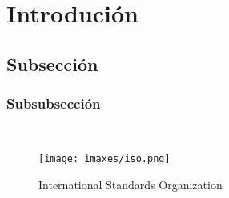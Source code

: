 \section{Introdución}
\subsection{Subsección}
\subsubsection{Subsubsección}
\blindtext \cite{web:1}\\

\begin{figure}[h]
	\centering
	\texttt{[image: imaxes/iso.png]}
	\caption{International Standards Organization}
\end{figure}

